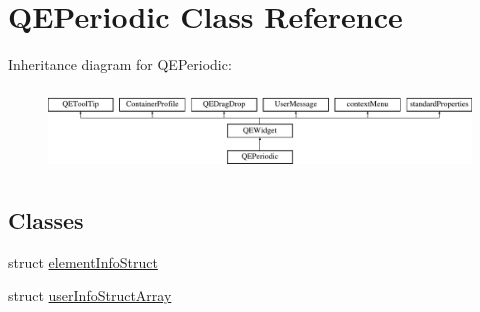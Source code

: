 \hypertarget{classQEPeriodic}{
\section{QEPeriodic Class Reference}
\label{classQEPeriodic}
}
Inheritance diagram for QEPeriodic:\begin{figure}[H]
\begin{center}
\leavevmode
\includegraphics[height=2.204725cm]{classQEPeriodic}
\end{center}
\end{figure}
\subsection*{Classes}
\begin{DoxyCompactItemize}
\item 
struct \hyperlink{structQEPeriodic_1_1elementInfoStruct}{elementInfoStruct}
\item 
struct \hyperlink{structQEPeriodic_1_1userInfoStructArray}{userInfoStructArray}
\end{DoxyCompactItemize}
